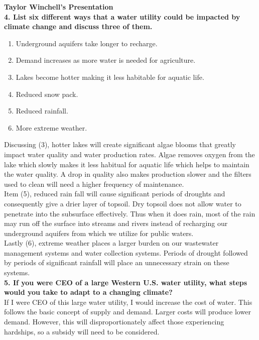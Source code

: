 \documentclass[12pt]{article}
\begin{document}
\textbf{Taylor Winchell's Presentation} \\

\textbf{4. List six different ways that a water utility could be impacted by climate change and discuss three of them.} \\

\begin{enumerate}
    \item Underground aquifers take longer to recharge.
    \item Demand increases as more water is needed for agriculture.
    \item Lakes become hotter making it less habitable for aquatic life.
    \item Reduced snow pack.
    \item Reduced rainfall.
    \item More extreme weather.
\end{enumerate}

Discussing (3), hotter lakes will create significant algae blooms that greatly impact water quality and water production rates. Algae removes oxygen from the lake which slowly makes it less habitual for aquatic life which helps to maintain the water quality. A drop in quality also makes production slower and the filters used to clean will need a higher frequency of maintenance. \\

Item (5), reduced rain fall will cause significant periods of droughts and consequently give a drier layer of topsoil. Dry topsoil does not allow water to penetrate into the subsurface effectively. Thus when it does rain, most of the rain may run off the surface into streams and rivers instead of recharging our underground aquifers from which we utilize for public waters. \\

Lastly (6), extreme weather places a larger burden on our wastewater management systems and water collection systems. Periods of drought followed by periods of significant rainfall will place an unnecessary strain on these systems. \\

\textbf{5. If you were CEO of a large Western U.S. water utility, what steps would you take to adapt to a changing climate?} \\

If I were CEO of this large water utility, I would increase the cost of water. This follows the basic concept of supply and demand. Larger costs will produce lower demand. However, this will disproportionately affect those experiencing hardships, so a subsidy will need to be considered. \\
\end{document}
